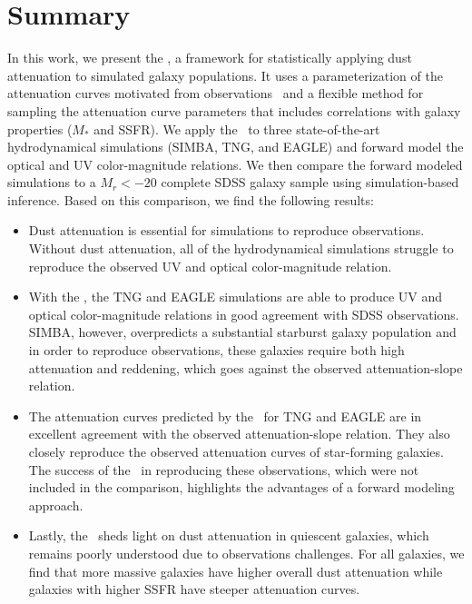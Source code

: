 \section{Summary}
In this work, we present the \eda, a framework for statistically applying dust
attenuation to simulated galaxy populations. It uses a parameterization of 
the attenuation curves motivated from observations~\citep{noll2009} and a
flexible method for sampling the attenuation curve parameters that includes
correlations with galaxy properties ($M_*$ and SSFR). We apply the \eda~to 
three state-of-the-art hydrodynamical simulations (SIMBA, TNG, and EAGLE) and
forward model the optical and UV color-magnitude relations. We then compare
the forward modeled simulations to a $M_r < -20$ complete SDSS galaxy sample  
using simulation-based inference. Based on this comparison, we find the
following results: 

\begin{itemize}
    \item Dust attenuation is essential for simulations to reproduce observations.
        Without dust attenuation, all of the hydrodynamical simulations struggle
        to reproduce the observed UV and optical color-magnitude relation. 
    \item With the \eda, the TNG and EAGLE simulations are able to produce UV and
        optical color-magnitude relations in good agreement with SDSS observations. 
        SIMBA, however, overpredicts a substantial starburst galaxy population
        and in order to reproduce observations, these galaxies require
        both high attenuation and reddening, which goes against the observed 
        attenuation-slope relation. 
    \item The attenuation curves predicted by the \eda~for TNG and EAGLE are in
        excellent agreement with the observed attenuation-slope
        relation. They also closely reproduce the observed attenuation curves
        of star-forming galaxies. The success of the \eda~in reproducing these
        observations, which were not included in the comparison, highlights the 
        advantages of a forward modeling approach. 
    \item Lastly, the \eda~sheds light on dust attenuation in quiescent
        galaxies, which remains poorly understood due to observations
        challenges. 
        For all galaxies, we find that more massive galaxies have higher overall dust
        attenuation while galaxies with higher SSFR have steeper attenuation
        curves. 
\end{itemize}

